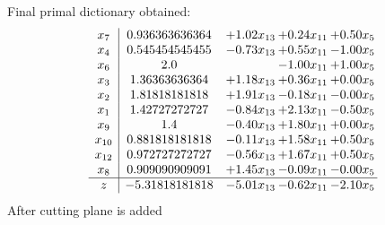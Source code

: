 \documentclass[8pt]{article}
\begin{document}
 Final primal dictionary obtained: 
\[\begin{array}{c| c c@{\hskip 2pt} c@{\hskip 2pt} c@{\hskip 2pt} }
 x_{7}   &  0.936363636364 & +  1.02 x_{13} & +  0.24 x_{11} & +  0.50 x_{5}\\
 x_{4}   &  0.545454545455 & -0.73 x_{13} & +  0.55 x_{11} & -1.00 x_{5}\\
 x_{6}   &  2.0  &   & -1.00 x_{11} & +  1.00 x_{5}\\
 x_{3}   &  1.36363636364 & +  1.18 x_{13} & +  0.36 x_{11} & +  0.00 x_{5}\\
 x_{2}   &  1.81818181818 & +  1.91 x_{13} & -0.18 x_{11} & -0.00 x_{5}\\
 x_{1}   &  1.42727272727 & -0.84 x_{13} & +  2.13 x_{11} & -0.50 x_{5}\\
 x_{9}   &  1.4 & -0.40 x_{13} & +  1.80 x_{11} & +  0.00 x_{5}\\
 x_{10}   &  0.881818181818 & -0.11 x_{13} & +  1.58 x_{11} & +  0.50 x_{5}\\
 x_{12}   &  0.972727272727 & -0.56 x_{13} & +  1.67 x_{11} & +  0.50 x_{5}\\
 x_{8}   &  0.909090909091 & +  1.45 x_{13} & -0.09 x_{11} & -0.00 x_{5}\\
\hline
z    &  -5.31818181818 & -5.01 x_{13} & -0.62 x_{11} & -2.10 x_{5}\\
\end{array}\]
 After cutting plane is added 
\end{document}

